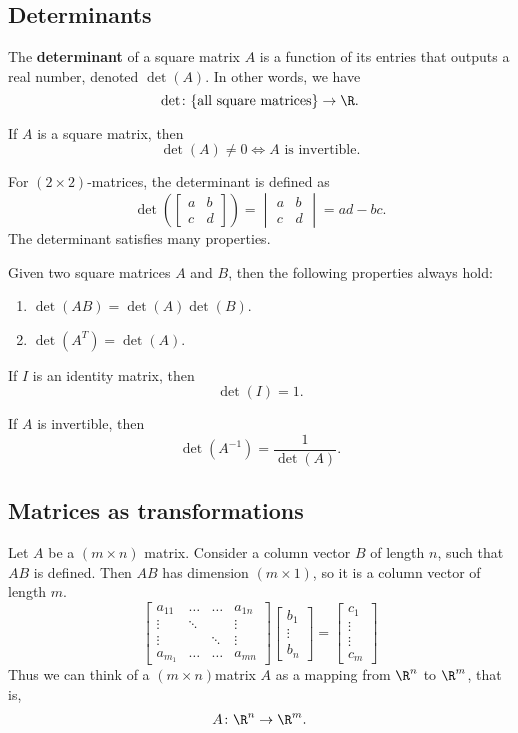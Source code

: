 \subsection{Determinants}
The \textbf{determinant} of a square matrix $A$ is a function of its entries that outputs a real number, denoted $\det(A)$. In other words, we have  \[
  \det\colon \{\text{all square matrices}\} \to \R
.\] 
\begin{theorem}
  If $A$ is a square matrix, then \[
    \det(A) \neq  0 \iff A \text{ is invertible}
  .\] 
\end{theorem}
For $(2\times 2)$-matrices, the determinant is defined as \[
  \det\left( \begin{bmatrix}a & b \\ c & d\end{bmatrix} \right) = \begin{vmatrix}a & b \\ c & d\end{vmatrix} = ad - bc
.\] 
The determinant satisfies many properties.
\begin{theorem}
  Given two square matrices $A$ and $B$, then the following properties always hold:
  \begin{enumerate}
    \item $\det(AB) = \det(A)\det(B)$.
    \item $\det(A^T) = \det(A)$.
  \end{enumerate}
\end{theorem}
\begin{theorem}
  If $I$ is an identity matrix, then \[
    \det(I) = 1
  .\] 
\end{theorem}
\begin{corollary}
  If $A$ is invertible, then  \[
    \det(A^{-1}) = \frac{1}{\det(A)}
  .\] 
\end{corollary}
\subsection{Matrices as transformations}
Let $A$ be a $(m\times n)$ matrix. Consider a column vector $B$ of length $n$, such that $AB$ is defined. Then $AB$ has dimension $(m\times 1)$, so it is a column vector of length $m$. \[
  \begin{bmatrix}
    a_{11} & \dots & \dots & a_{1n} \\
    \vdots & \ddots & & \vdots \\
    \vdots & & \ddots & \vdots \\
    a_{m_1} & \dots & \dots & a_{mn}
  \end{bmatrix}
  \begin{bmatrix}
    b_1 \\ \vdots \\ b_{n}
  \end{bmatrix}
  = 
  \begin{bmatrix}
    c_1 \\ \vdots \\ \vdots \\ c_{m}
  \end{bmatrix}
\] Thus we can think of a $(m\times n)$matrix $A$ as a mapping from $\R^n$ to $\R^m$, that is, \[
  A\colon \R^n \to \R^m
.\] 
